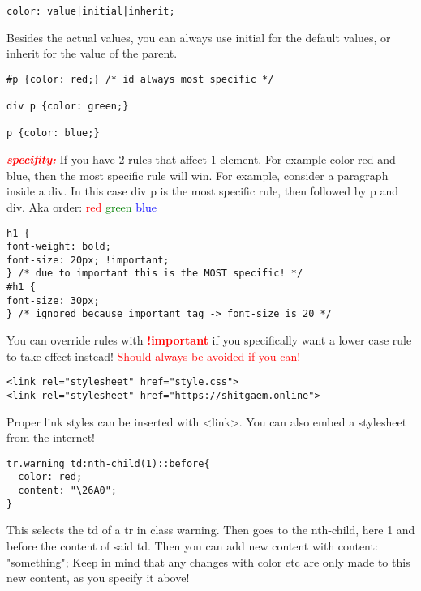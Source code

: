 \documentclass[main.tex,fontsize=6pt,paper=a4,paper=landscape,DIV=calc,]{scrartcl}
\begin{document}
\begin{multicols*}{4}
\vspace{-2mm}
\begin{lstlisting}
color: value|initial|inherit;
\end{lstlisting}
\vspace{2mm}
Besides the actual values, you can always use initial for the default values, or inherit for the value of the parent.

\vspace{-2mm}
\begin{lstlisting}
#p {color: red;} /* id always most specific */

div p {color: green;}

p {color: blue;}
\end{lstlisting}
\vspace{2mm} 
\textcolor{red}{\textbf{\emph{specifity:}}} \newline
If you have 2 rules that affect 1 element. For example color red and blue, then the most specific rule will win.\newline
For example, consider a paragraph inside a div.\newline
In this case div p is the most specific rule, then followed by p and div.\newline
Aka order: \textcolor{red}{red} \textcolor{green}{green} \textcolor{blue}{blue}

\vspace{-2mm}
\begin{lstlisting}
h1 {
font-weight: bold;
font-size: 20px; !important;
} /* due to important this is the MOST specific! */
#h1 {
font-size: 30px;
} /* ignored because important tag -> font-size is 20 */
\end{lstlisting}
\vspace{2mm}
 You can override rules with \textbf{\textcolor{red}{!important}} if you specifically want a lower case rule to take effect instead!\newline
\textcolor{red}{Should always be avoided if you can!}

\vspace{-2mm}
\begin{lstlisting}
<link rel="stylesheet" href="style.css">
<link rel="stylesheet" href="https://shitgaem.online">
\end{lstlisting}
\vspace{2mm}  
Proper link styles can be inserted with <link>. You can also embed a stylesheet from the internet!

\vspace{-2mm}
\begin{lstlisting}
tr.warning td:nth-child(1)::before{
  color: red;
  content: "\26A0";
}
\end{lstlisting}
\vspace{2mm}
 This selects the td of a tr in class warning. Then goes to the nth-child, here 1 and before the content of said td.\newline
Then you can add new content with content: "something";\newline
Keep in mind that any changes with color etc are only made to this new content,\newline 
as you specify it above!



\end{multicols*}
\end{document}
